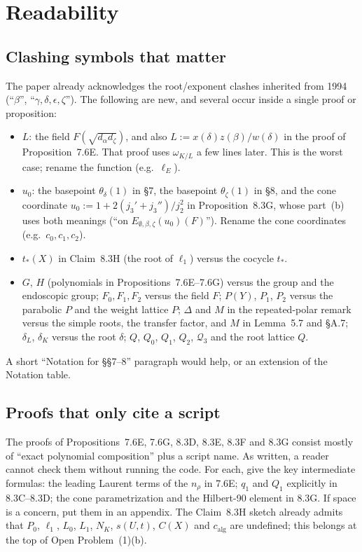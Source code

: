 \documentclass[12pt,letterpaper]{amsart}
\begin{document}
\section{Readability}

\subsection{Clashing symbols that matter}

The paper already acknowledges the root/exponent clashes inherited from 1994
(``$\beta$'', ``$\gamma,\delta,\epsilon,\zeta$''). The following are new, and
several occur inside a single proof or proposition:
\begin{itemize}
\item $L$: the field $F(\sqrt{d_\alpha d_\zeta})$, and also
$L:=x(\delta)z(\beta)/w(\delta)$ in the proof of Proposition~7.6E. That
proof uses $\omega_{K/L}$ a few lines later. This is the worst case; rename
the function (e.g.\ $\ell_E$).
\item $u_0$: the basepoint $\theta_\delta(1)$ in \S7, the basepoint
$\theta_\zeta(1)$ in \S8, and the cone coordinate
$u_0:=1+2(j_3'+j_3'')/j_2^2$ in Proposition~8.3G, whose part~(b) uses both
meanings (``on $E_{\emptyset,\beta,\zeta}(u_0)(F)$''). Rename the cone
coordinates (e.g.\ $c_0,c_1,c_2$).
\item $t_*(X)$ in Claim~8.3H (the root of $\ell_1$) versus the cocycle $t_*$.
\item $G$, $H$ (polynomials in Propositions~7.6E--7.6G) versus the group and
the endoscopic group; $F_0,F_1,F_2$ versus the field $F$; $P(Y)$, $P_1$,
$P_2$ versus the parabolic $P$ and the weight lattice $P$; $\Delta$ and $M$
in the repeated-polar remark versus the simple roots, the transfer factor, and
$M$ in Lemma~5.7 and \S A.7; $\delta_L$, $\delta_K$ versus the root $\delta$;
$Q$, $Q_0$, $Q_1$, $Q_2$, $\mathcal Q_3$ and the root lattice $Q$.
\end{itemize}
A short ``Notation for \S\S7--8'' paragraph would help, or an extension of the
Notation table.

\subsection{Proofs that only cite a script}

The proofs of Propositions~7.6E, 7.6G, 8.3D, 8.3E, 8.3F and 8.3G consist mostly
of ``exact polynomial composition'' plus a script name. As written, a reader
cannot check them without running the code. For each, give the key
intermediate formulas: the leading Laurent terms of the $n_\rho$ in 7.6E;
$q_1$ and $Q_1$ explicitly in 8.3C--8.3D; the cone parametrization and the
Hilbert-90 element in 8.3G. If space is a concern, put them in an appendix.
The Claim~8.3H sketch already admits that $P_0$, $\ell_1$, $L_0$, $L_1$,
$N_K$, $s(U,t)$, $C(X)$ and $c_{\mathrm{alg}}$ are undefined; this belongs at
the top of Open Problem~(1)(b).
\end{document}
